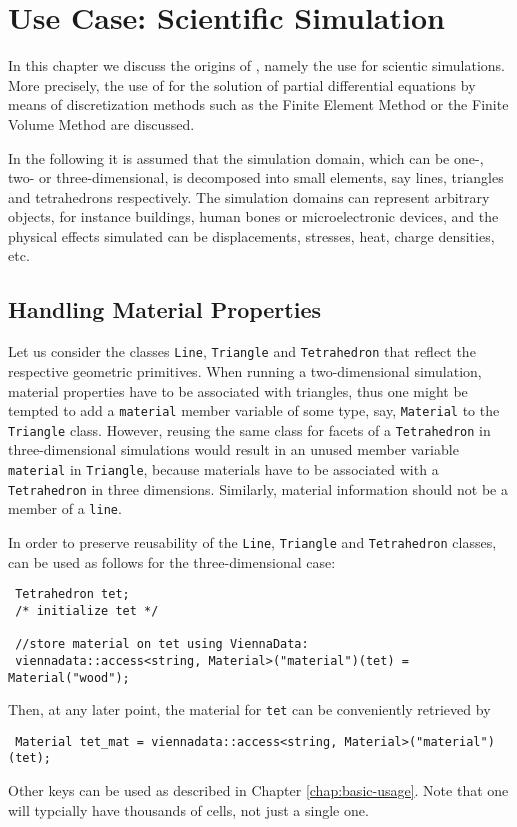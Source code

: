 \chapter{Use Case: Scientific Simulation} \label{chap:use-cases}
In this chapter we discuss the origins of {\ViennaData}, namely the use for scientic simulations.
More precisely, the use of {\ViennaData} for the solution of partial differential equations by means of discretization methods such as the Finite Element Method or the Finite Volume Method are discussed.

In the following it is assumed that the simulation domain, which can be one-, two- or three-dimensional, is decomposed into small elements, say lines, triangles and tetrahedrons respectively. The simulation domains can represent arbitrary objects, for instance buildings, human bones or microelectronic devices, and the physical effects simulated can be displacements, stresses, heat, charge densities, etc. 

\section{Handling Material Properties}
Let us consider the classes \lstinline|Line|, \lstinline|Triangle| and \lstinline|Tetrahedron| that reflect the respective geometric primitives.
When running a two-dimensional simulation, material properties have to be associated with triangles, thus one might be tempted to add a \lstinline|material| member variable of some type, say, \lstinline|Material| to the \lstinline|Triangle| class. 
However, reusing the same class for facets of a \lstinline|Tetrahedron| in three-dimensional simulations would result in an unused
member variable \lstinline|material| in \lstinline|Triangle|, because materials have to be associated with a \lstinline|Tetrahedron| in three dimensions.
Similarly, material information should not be a member of a \lstinline|line|.

In order to preserve reusability of the \lstinline|Line|, \lstinline|Triangle| and \lstinline|Tetrahedron| classes, {\ViennaData} can be used as follows for the three-dimensional case:
\begin{lstlisting}
 Tetrahedron tet;
 /* initialize tet */

 //store material on tet using ViennaData:
 viennadata::access<string, Material>("material")(tet) = Material("wood"); 
\end{lstlisting}
Then, at any later point, the material for \lstinline|tet| can be conveniently retrieved by
\begin{lstlisting}
 Material tet_mat = viennadata::access<string, Material>("material")(tet); 
\end{lstlisting}
Other keys can be used as described in Chapter \ref{chap:basic-usage}. Note that one will typcially have thousands of cells, not just a single one.


